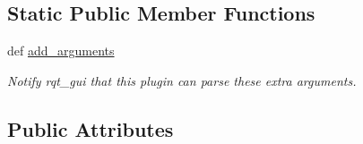 \subsection*{Static Public Member Functions}
\begin{DoxyCompactItemize}
\item 
def \hyperlink{classaerial__autonomy_1_1aerial__autonomy__gui_1_1EventTransmissionGUI_adffec416c73f6f719e9592d0e2286c8f}{add\-\_\-arguments}
\begin{DoxyCompactList}\small\item\em Notify rqt\-\_\-gui that this plugin can parse these extra arguments. \end{DoxyCompactList}\end{DoxyCompactItemize}
\subsection*{Public Attributes}
